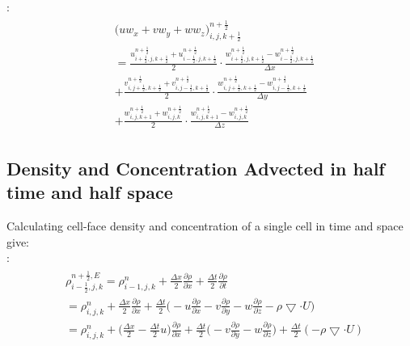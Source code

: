 \documentclass{article}
\numberwithin{equation}{subsection}
\begin{document}
:
\begin{align}
\begin{split}
& \Big( uw_x + vw_y + ww_z\Big)^{n+\frac{1}{2}}_{i,j,k+\frac{1}{2}} \\
& = \frac{u^{n+\frac{1}{2}}_{i+\frac{1}{2},j,k+\frac{1}{2}} + u^{n+\frac{1}{2}}_{i-\frac{1}{2},j,k+\frac{1}{2}}}{2} \cdot \frac{w^{n+\frac{1}{2}}_{i+\frac{1}{2},j,k+\frac{1}{2}} - w^{n+\frac{1}{2}}_{i-\frac{1}{2},j,k+\frac{1}{2}}}{\Delta x}\\
& + \frac{v^{n+\frac{1}{2}}_{i,j+\frac{1}{2},k+\frac{1}{2}} + v^{n+\frac{1}{2}}_{i,j-\frac{1}{2},k+\frac{1}{2}}}{2} \cdot \frac{w^{n+\frac{1}{2}}_{i,j+\frac{1}{2},k+\frac{1}{2}} - w^{n+\frac{1}{2}}_{i,j-\frac{1}{2},k+\frac{1}{2}}}{\Delta y}\\
& + \frac{w^{n+\frac{1}{2}}_{i,j,k+1} + w^{n+\frac{1}{2}}_{i,j,k}}{2} \cdot \frac{w^{n+\frac{1}{2}}_{i,j,k+1} - w^{n+\frac{1}{2}}_{i,j,k}}{\Delta z}
\end{split}
\end{align}





\subsection{Density and Concentration Advected in half time and half space}
Calculating cell-face density and concentration of a single cell in time and space give:\\


:
\begin{align}
\begin{split}
& \rho_{i-\frac{1}{2},j,k}^{n+\frac{1}{2}, E} = \rho_{i-1,j,k}^n + \frac{\Delta x}{2} \frac{\partial \rho}{\partial x} + \frac{\Delta t}{2} \frac{\partial \rho}{\partial t} \\
& = \rho_{i,j,k}^{n} + \frac{\Delta x}{2} \frac{\partial \rho}{\partial x} + \frac{\Delta t}{2} \Big( -u\frac{\partial \rho}{\partial x} - v\frac{\partial \rho}{\partial y} - w\frac{\partial \rho}{\partial z} - \rho \bigtriangledown \cdot U \Big) \\
& = \rho_{i,j,k}^{n} + \big( \frac{\Delta x}{2} - \frac{\Delta t}{2}u\big)\frac{\partial \rho}{\partial x} + \frac{\Delta t}{2} \big( - v\frac{\partial \rho}{\partial y} - w\frac{\partial \rho}{\partial z} \big) + \frac{\Delta t}{2} (-\rho \bigtriangledown \cdot U)
\end{split}
\end{align}
\end{document}
